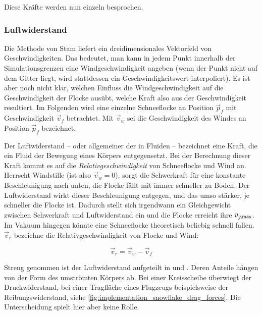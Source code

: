 Diese Kräfte werden nun einzeln besprochen.

\subsubsection{Luftwiderstand}

Die Methode von Stam liefert ein dreidimensionales Vektorfeld von
Geschwindigkeiten. Das bedeutet, man kann in jedem Punkt innerhalb der
Simulationsgrenzen eine Windgeschwindigkeit angeben (wenn der Punkt
nicht auf dem Gitter liegt, wird stattdessen ein Geschwindigkeitswert
interpoliert). Es ist aber noch nicht klar, welchen Einfluss die
Windgeschwindigkeit auf die Geschwindigkeit der Flocke ausübt, welche
Kraft also aus der Geschwindigkeit resultiert. Im Folgenden wird eine
einzelne Schneeflocke an Position $\vec{p}_f$ mit Geschwindigkeit
$\vec{v}_{f}$ betrachtet. Mit $\vec{v}_w$ sei die Geschwindigkeit des
Windes an Position $\vec{p}_f$ bezeichnet.

Der Luftwiderstand -- oder allgemeiner der
 in Fluiden -- bezeichnet eine
Kraft, die ein Fluid der Bewegung eines Körpers entgegensetzt. Bei der
Berechnung dieser Kraft kommt es auf die \emph{Relativgeschwindigkeit}
von Schneeflocke und Wind an. Herrscht Windstille (ist also $\vec{v}_w
= 0$), sorgt die Schwerkraft für eine konstante Beschleunigung nach
unten, die Flocke fällt mit immer schneller zu Boden. Der
Luftwiderstand wirkt dieser Beschleunigung entgegen, und das umso
stärker, je schneller die Flocke ist. Dadurch stellt sich irgendwann
ein Gleichgewicht zwischen Schwerkraft und Luftwiderstand ein und die
Flocke erreicht ihre 
$v_{y,\textnormal{max}}$. Im Vakuum hingegen könnte eine
Schneeflocke theoretisch beliebig schnell fallen. $\vec{v}_r$
bezeichne die Relativgeschwindigkeit von Flocke und Wind:

\begin{equation}
\vec{v}_r = \vec{v}_w - \vec{v}_f
\end{equation}

Streng genommen ist der Luftwiderstand aufgeteilt in
 und
. Deren Anteile hängen von der Form
des umströmten Körpers ab. Bei einer Kreisscheibe überwiegt der
Druckwiderstand, bei einer Tragfläche eines Flugzeugs beispielsweise
der Reibungswiderstand, siehe
\autoref{fig:implementation_snowflake_drag_forces}. Die Unterscheidung
spielt hier aber keine Rolle.

